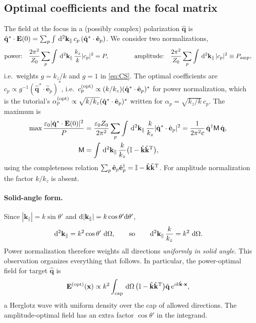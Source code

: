 \documentclass[11pt,letterpaper]{article}
\newcommand{\vect}[1]{\mathbf{#1}}
\newcommand{\Ev}{\vect{E}}
\newcommand{\xv}{\vect{x}}
\newcommand{\kv}{\vect{k}}
\newcommand{\kp}{\kv_{\parallel}}
\newcommand{\khat}{\hat{\kv}}
\newcommand{\qhat}{\hat{\vect{q}}}
\newcommand{\ep}{\hat{\vect{e}}_p}
\newcommand{\dkk}{\,{\rm d}^2\kp}
\newcommand{\dO}{\,{\rm d}\Omega}
\newcommand{\II}{\mathbb{I}}
\begin{document}
\subsection{Optimal coefficients and the focal matrix}
The field at the focus in a (possibly complex) polarization $\qhat$ is $\qhat^*\cdot\Ev(0)=\sum_p\int\dkk\,c_p\,(\qhat^*\cdot\ep)$. We consider two normalizations,
\begin{align}
    \text{power:}\quad \frac{2\pi^2}{Z_0}\sum_p\int\dkk\,\frac{k_z}{k}|c_p|^2 = P, \qquad\qquad
    \text{amplitude:}\quad \frac{2\pi^2}{Z_0}\sum_p\int\dkk\,|c_p|^2 \equiv P_{\rm amp},
\end{align}
i.e.\ weights $g=k_z/k$ and $g=1$ in \eqref{eq:CS}. The optimal coefficients are $c_p\propto g^{-1}(\qhat^*\cdot\ep)^*$, i.e.\ $c_p^{\rm (opt)}\propto(k/k_z)(\qhat^*\cdot\ep)^*$ for power normalization, which is the tutorial's $\alpha_p^{\rm (opt)}\propto\sqrt{k/k_z}(\qhat^*\cdot\ep)^*$ written for $\alpha_p=\sqrt{k_z/k}\,c_p$. The maximum is
\begin{align}
    \max\frac{\varepsilon_0|\qhat^*\cdot\Ev(0)|^2}{P} &= \frac{\varepsilon_0 Z_0}{2\pi^2}\sum_p\int\dkk\,\frac{k}{k_z}|\qhat^*\cdot\ep|^2
    = \frac{1}{2\pi^2c}\,\qhat^\dagger\mathsf{M}\,\qhat, \nonumber\\
    \mathsf{M}&=\int\dkk\,\frac{k}{k_z}\big(\II-\khat\khat^{\rm T}\big),
    \label{eq:Mmatrix}
\end{align}
using the completeness relation $\sum_p\ep\ep^\dagger=\II-\khat\khat^{\rm T}$. For amplitude normalization the factor $k/k_z$ is absent.

\paragraph{Solid-angle form.} Since $|\kp|=k\sin\theta'$ and ${\rm d}|\kp|=k\cos\theta'{\rm d}\theta'$,
\begin{align}
    \dkk = k^2\cos\theta'\,\dO, \qquad\text{so}\qquad \dkk\,\frac{k}{k_z} = k^2\,\dO.
    \label{eq:dOmega}
\end{align}
Power normalization therefore weights all directions \emph{uniformly in solid angle}. This observation organizes everything that follows. In particular, the power-optimal field for target $\qhat$ is
\begin{align}
    \Ev^{\rm (opt)}(\xv) \propto k^2\int_{\rm cap}\dO\,\big(\II-\khat\khat^{\rm T}\big)\qhat\,e^{ik\khat\cdot\xv},
    \label{eq:Herglotz}
\end{align}
a Herglotz wave with uniform density over the cap of allowed directions. The amplitude-optimal field has an extra factor $\cos\theta'$ in the integrand.
\end{document}
